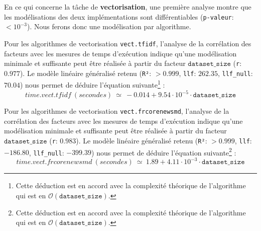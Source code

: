			En ce qui concerne la tâche de \textbf{vectorisation}, une première analyse montre que les modélisations des deux implémentations sont différentiables  (\texttt{p-valeur}: $< 10^{-3}$). Nous ferons donc une modélisation par algorithme.
		
			Pour les algorithmes de vectorisation \texttt{vect.tfidf}, l'analyse de la corrélation des facteurs avec les mesures de temps d'exécution indique qu'une modélisation minimale et suffisante peut être réalisée à partir du facteur $\texttt{dataset\_size}$ (\texttt{r}: $0.977$).
			Le modèle linéaire généralisé retenu (\texttt{R²}: $> 0.999$, \texttt{llf}: $262.35$, \texttt{llf\_null}: $70.04$) nous permet de déduire l'équation suivante\footnote{Cette déduction est en accord avec la complexité théorique de l'algorithme qui est en $ \mathcal{O}(\texttt{dataset\_size}) $.} :
			\begin{equation}
				time.vect.tfidf~(secondes)~
				\simeq~-0.014 + 9.54 \cdot 10^{-5} \cdot \texttt{dataset\_size}
			\end{equation}
			
			Pour les algorithmes de vectorisation \texttt{vect.frcorenewsmd}, l'analyse de la corrélation des facteurs avec les mesures de temps d'exécution indique qu'une modélisation minimale et suffisante peut être réalisée à partir du facteur $\texttt{dataset\_size}$ (\texttt{r}: $0.983$).
			Le modèle linéaire généralisé retenu (\texttt{R²}: $> 0.999$, \texttt{llf}: $-186.80$, \texttt{llf\_null}: $-399.39$) nous permet de déduire l'équation suivante\footnote{Cette déduction est en accord avec la complexité théorique de l'algorithme qui est en $ \mathcal{O}(\texttt{dataset\_size}) $.} :
			\begin{equation}
				time.vect.frcorenewsmd~(secondes)~
				\simeq~1.89 + 4.11 \cdot 10^{-3} \cdot \texttt{dataset\_size}
			\end{equation}
			
